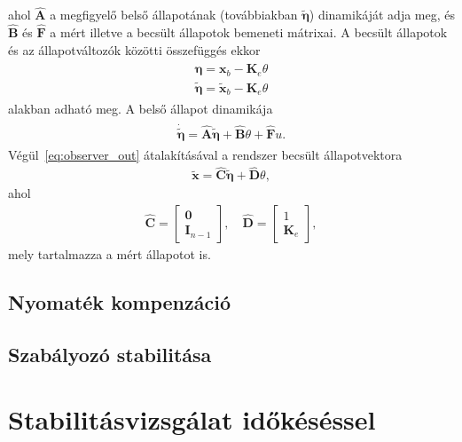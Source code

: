 ahol $\hat{\bm A}$ a megfigyelő belső állapotának (továbbiakban $\tilde{\bm \eta}$) 
dinamikáját adja meg, és $\hat{\bm B}$ és $\hat{\bm F}$ a mért illetve a becsült állapotok 
bemeneti mátrixai. A becsült állapotok és az állapotváltozók közötti összefüggés ekkor
\begin{align}
    \begin{split}
    \bm \eta = \bm x_b - \bm K_e \theta \\
    \tilde{\bm \eta} = \tilde{\bm x}_b - \bm K_e \theta
    \end{split}
\end{align}
alakban adható meg. A belső állapot dinamikája
\begin{align}
    \begin{split}
    \dot{\tilde{\bm \eta}} = \hat{\bm A} \tilde{\bm \eta} + \hat{\bm B} \theta + \hat{\bm F} u.
    \end{split}
\end{align}
Végül~\eqref{eq:observer_out} átalakításával a rendszer becsült állapotvektora
\begin{align}
    \tilde{\bm x} = \hat{\bm C} \tilde{\bm \eta} + \hat{\bm D} \theta,
\end{align}
ahol
\begin{align}
    \hat{\bm C} = 
    \begin{bmatrix}
        \bm 0 \\
        \bm I_{n-1}
    \end{bmatrix},
    \quad
    \hat{\bm D} = 
    \begin{bmatrix}
        1 \\
        \bm K_e
    \end{bmatrix},
\end{align}
mely tartalmazza a mért állapotot is.

\section{Nyomaték kompenzáció}

\section{Szabályozó stabilitása}

\chapter{Stabilitásvizsgálat időkéséssel}\label{chap:time_delay_stability}

